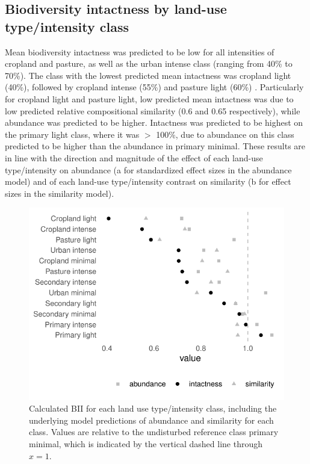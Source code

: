 \documentclass[titlesmallcaps,copyrightpage]{uomthesis}\usepackage[]{graphicx}\usepackage[]{color}
\begin{document}
\subsection{Biodiversity intactness by land-use type/intensity class}
Mean biodiversity intactness was predicted to be low for all intensities of cropland and pasture, as well as the urban intense class (ranging from 40\% to 70\%). The class with the lowest predicted mean intactness was cropland light (40\%), followed by cropland intense (55\%) and pasture light (60\%) \citep[, this finding is similar to][]{newbold_global_2015}. Particularly for cropland light and pasture light, low predicted mean intactness was due to low predicted relative compositional similarity (0.6 and 0.65 respectively), while abundance was predicted to be higher. Intactness was predicted to be highest on the primary light class, where it was \(>\) 100\%, due to abundance on this class predicted to be higher than the abundance in primary minimal. These results are in line with the direction and magnitude of the effect of each land-use type/intensity on abundance (a for standardized effect sizes in the abundance model) and of each land-use type/intensity contrast on similarity (b for effect sizes in the similarity model).

\begin{figure}[htb]
  \centering
    \includegraphics{chapters/figures/chapter4/fig_biodivbyclass.pdf}
    \caption{Calculated BII for each land use type/intensity class, including the underlying model predictions of abundance and similarity for each class. Values are relative to the undisturbed reference class primary minimal, which is indicated by the vertical dashed line through \(x=1\).}
    \label{ch4:fig_biodivbyclass}
\end{figure}
\end{document}
